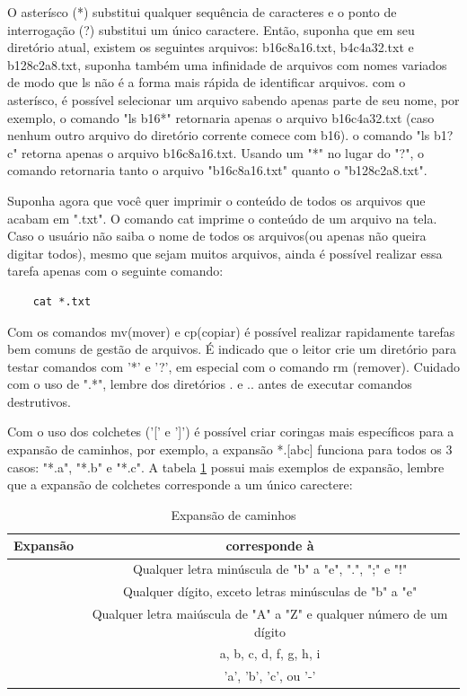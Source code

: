 \documentclass[oneside, 11 pt]{article}
\begin{document}
	O asterísco (*) substitui qualquer sequência de caracteres e o ponto de interrogação (?) substitui um único caractere. Então, suponha que em seu diretório atual, existem os seguintes arquivos: b16c8a16.txt, b4c4a32.txt e b128c2a8.txt, suponha também uma infinidade de arquivos com nomes variados de modo que ls não é a forma mais rápida de identificar arquivos. com o asterísco, é possível selecionar um arquivo sabendo apenas parte de seu nome, por exemplo, o comando "ls b16*" retornaria apenas o arquivo b16c4a32.txt (caso nenhum outro arquivo do diretório corrente comece com b16). o comando "ls b1?c" retorna apenas o arquivo b16c8a16.txt. Usando um "*" no lugar do "?", o comando retornaria tanto o arquivo "b16c8a16.txt" quanto o "b128c2a8.txt".
	
	Suponha agora que você quer imprimir o conteúdo de todos os arquivos que acabam em ".txt". O comando cat imprime o conteúdo de um arquivo na tela. Caso o usuário não saiba o nome de todos os arquivos(ou apenas não queira digitar todos), mesmo que sejam muitos arquivos, ainda é possível realizar essa tarefa apenas com o seguinte comando:
	\begin{lstlisting}
	cat *.txt
	\end{lstlisting}
	Com os comandos mv(mover) e cp(copiar) é possível realizar rapidamente tarefas bem comuns de gestão de arquivos. É indicado que o leitor crie um diretório para testar comandos com '*' e '?', em especial com o comando rm (remover). Cuidado com o uso de ".*", lembre dos diretórios . e .. antes de executar comandos destrutivos.
	
	Com o uso dos colchetes ('[' e ']') é possível criar coringas mais específicos para a expansão de caminhos, por exemplo, a expansão *.[abc] funciona para todos os 3 casos: "*.a", "*.b" e "*.c". A tabela \ref{table:2} possui mais exemplos de expansão, lembre que a expansão de colchetes corresponde a um único carectere:
	\begin{table}[!ht]
		\centering
		\begin{tabular}{ | c | c | } 
			\hline
			\bfseries Expansão & \bfseries corresponde à \\
			\hline
			[b-e.;!] & Qualquer letra minúscula de "b" a "e", ".", ";" e "!" \\
			\hline
			[!b-e] & Qualquer dígito, exceto letras minúsculas de "b" a "e" \\
			\hline
			[A-Z0-9] & Qualquer letra maiúscula de "A" a "Z" e qualquer número de um dígito \\
			\hline
			[a-df-i] & a, b, c, d, f, g, h, i \\
			\hline
			[abc-] & 'a', 'b', 'c', ou '-' \\
			\hline
		\end{tabular}
		\caption{Expansão de caminhos}
		\label{table:2}
	\end{table}
	
\end{document}

